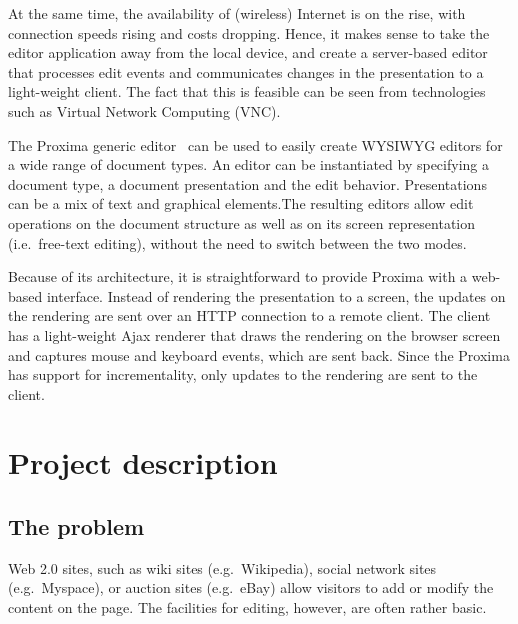 \documentclass[10pt]{article}
\begin{document}
At the same time, the availability of (wireless) Internet is on the rise, with connection speeds rising and costs dropping. Hence, it makes sense to take the editor application away from the local device, and create a server-based editor that processes edit events and communicates changes in the presentation to a light-weight client. The fact that this is feasible can be seen from technologies such as Virtual Network Computing (VNC).

The Proxima generic editor~\cite{schrage08proximaHome, schrage04proxima} can be used to easily create WYSIWYG editors for a wide range of document types. An editor can be instantiated by specifying a document type, a document presentation and the edit behavior. Presentations can be a mix of text and graphical elements.The resulting editors allow edit operations on the document structure as well as on its screen representation (i.e.\ free-text editing), without the need to switch between the two modes.

Because of its architecture, it is straightforward to provide Proxima with a web-based interface. Instead of rendering the presentation to a screen, the updates on the rendering are sent over an HTTP connection to a remote client. The client has a light-weight Ajax renderer that draws the rendering on the browser screen and captures mouse and keyboard events, which are sent back. Since the Proxima has support for incrementality, only updates to the rendering are sent to the client.

\ec



\section{Project description}

\subsection{The problem} 

Web 2.0 sites, such as wiki sites (e.g.\ Wikipedia), social network sites (e.g.\ Myspace), or auction sites (e.g.\ eBay) allow visitors to add or modify the content on the page. The facilities for editing, however, are often rather basic. 
\end{document}
